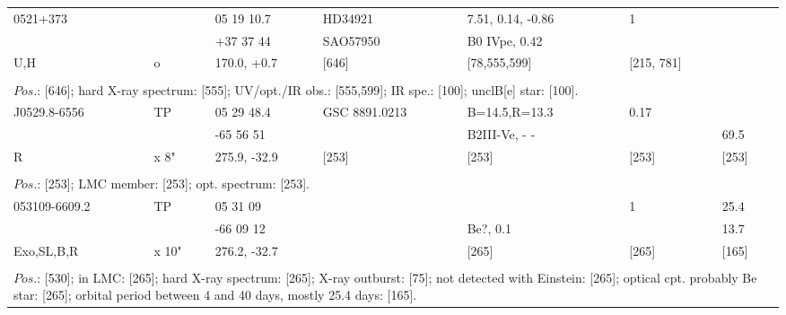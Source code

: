 \documentclass{aa}
\begin{document}
\begin{table*}[h]
\begin{tabular}{p{2.5cm}p{1cm}p{1.8cm}p{2.3cm}p{3.3cm}p{2.0cm}p{2.2cm}}
\noalign{\smallskip}
\hline
\noalign{\smallskip}
 0521+373     &           & 05 19 10.7       & HD34921        & 7.51, 0.14, -0.86      &   1                      &                            \\
                        &           & +37 37 44        & SAO57950     & B0 IVpe, 0.42          &                           &                   \\
U,H                 &  o      & 170.0, +0.7       &     [646]           &    [78,555,599]          & [215, 781]      &                       \\
\\
\multicolumn{7}{p{17.5cm}}{
$Pos$.: [646]; hard X-ray spectrum: [555]; UV/opt./IR obs.: [555,599]; IR spe.: [100]; unclB[e] star: [100].}\\

\hline
\noalign{\smallskip}
J0529.8-6556  &    TP     &  05 29 48.4   & GSC 8891.0213  &   B=14.5,R=13.3  &         0.17         &   \\        
                           &              & -65 56 51      &                           &   B2III-Ve, - -      &                         &  69.5 \\
R                        &    x 8"   & 275.9, -32.9  &        [253]         &   [253]                  &            [253]      &  [253] \\
  
\\
\multicolumn{7}{p{17.5cm}}{
$Pos$.: [253]; LMC member: [253]; opt. spectrum: [253].      }\\

\noalign{\smallskip}
\hline
\noalign{\smallskip}
053109-6609.2   &   TP      & 05 31 09            &                      &                          &   1                &           25.4         \\
                              &              & -66 09 12          &                       & Be?, 0.1         &                     &     13.7          \\
Exo,SL,B,R        &  x 10"  & 276.2, -32.7      &                       &    [265]            &        [265]    &           [165]         \\
\\
\multicolumn{7}{p{17.5cm}}{
$Pos$.: [530]; in LMC: [265];  hard X-ray spectrum: [265]; X-ray outburst: [75]; not detected with Einstein: [265]; optical cpt. 
probably Be star: [265]; orbital period between 4 and 40 days, mostly 25.4 days: [165].}\\


\end{tabular}
\end{table*}
\end{document}
